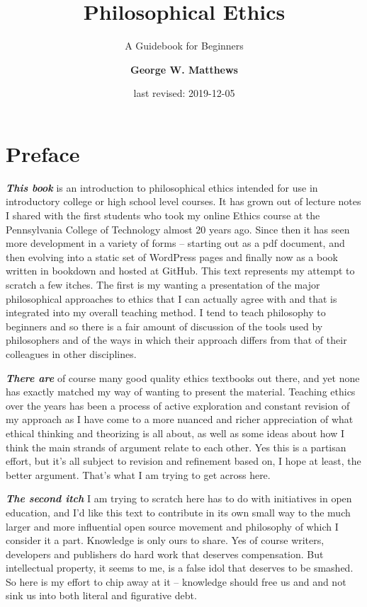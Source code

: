\documentclass[]{book}
\title{Philosophical Ethics}
\subtitle{A Guidebook for Beginners}
\author{\textbf{George W. Matthews}}
\date{last revised: 2019-12-05}
\begin{document}
\maketitle

{
\setcounter{tocdepth}{2}
\tableofcontents
}
\hypertarget{preface}{%
\chapter*{Preface}\label{preface}}


\textbf{\emph{This book}} is an introduction to philosophical ethics intended for use in introductory college or high school level courses. It has grown out of lecture notes I shared with the first students who took my online Ethics course at the Pennsylvania College of Technology almost 20 years ago. Since then it has seen more development in a variety of forms -- starting out as a pdf document, and then evolving into a static set of WordPress pages and finally now as a book written in bookdown and hosted at GitHub. This text represents my attempt to scratch a few itches. The first is my wanting a presentation of the major philosophical approaches to ethics that I can actually agree with and that is integrated into my overall teaching method. I tend to teach philosophy to beginners and so there is a fair amount of discussion of the tools used by philosophers and of the ways in which their approach differs from that of their colleagues in other disciplines.

\textbf{\emph{There are}} of course many good quality ethics textbooks out there, and yet none has exactly matched my way of wanting to present the material. Teaching ethics over the years has been a process of active exploration and constant revision of my approach as I have come to a more nuanced and richer appreciation of what ethical thinking and theorizing is all about, as well as some ideas about how I think the main strands of argument relate to each other. Yes this is a partisan effort, but it's all subject to revision and refinement based on, I hope at least, the better argument. That's what I am trying to get across here.

\textbf{\emph{The second itch}} I am trying to scratch here has to do with initiatives in open education, and I'd like this text to contribute in its own small way to the much larger and more influential open source movement and philosophy of which I consider it a part. Knowledge is only ours to share. Yes of course writers, developers and publishers do hard work that deserves compensation. But intellectual property, it seems to me, is a false idol that deserves to be smashed. So here is my effort to chip away at it -- knowledge should free us and and not sink us into both literal and figurative debt.
\end{document}
